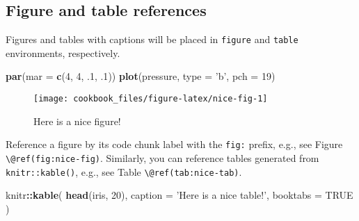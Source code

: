 \documentclass[]{book}
\newenvironment{Shaded}{\begin{snugshade}}{\end{snugshade}}
\newcommand{\DataTypeTok}[1]{\textcolor[rgb]{0.13,0.29,0.53}{#1}}
\newcommand{\DecValTok}[1]{\textcolor[rgb]{0.00,0.00,0.81}{#1}}
\newcommand{\FloatTok}[1]{\textcolor[rgb]{0.00,0.00,0.81}{#1}}
\newcommand{\KeywordTok}[1]{\textcolor[rgb]{0.13,0.29,0.53}{\textbf{#1}}}
\newcommand{\NormalTok}[1]{#1}
\newcommand{\OperatorTok}[1]{\textcolor[rgb]{0.81,0.36,0.00}{\textbf{#1}}}
\newcommand{\OtherTok}[1]{\textcolor[rgb]{0.56,0.35,0.01}{#1}}
\newcommand{\StringTok}[1]{\textcolor[rgb]{0.31,0.60,0.02}{#1}}
\theoremstyle{definition}
\theoremstyle{definition}
\theoremstyle{definition}
\theoremstyle{remark}
\begin{document}
\hypertarget{figure-and-table-references}{%
\subsection{Figure and table
references}\label{figure-and-table-references}}

Figures and tables with captions will be placed in \texttt{figure} and
\texttt{table} environments, respectively.

\begin{Shaded}
\begin{Highlighting}[]
\KeywordTok{par}\NormalTok{(}\DataTypeTok{mar =} \KeywordTok{c}\NormalTok{(}\DecValTok{4}\NormalTok{, }\DecValTok{4}\NormalTok{, }\FloatTok{.1}\NormalTok{, }\FloatTok{.1}\NormalTok{))}
\KeywordTok{plot}\NormalTok{(pressure, }\DataTypeTok{type =} \StringTok{'b'}\NormalTok{, }\DataTypeTok{pch =} \DecValTok{19}\NormalTok{)}
\end{Highlighting}
\end{Shaded}

\begin{figure}

{\centering \texttt{[image: cookbook\_files/figure-latex/nice-fig-1]} 

}

\caption{Here is a nice figure!}\label{fig:nice-fig}
\end{figure}

Reference a figure by its code chunk label with the \texttt{fig:}
prefix, e.g., see Figure \texttt{\textbackslash{}@ref(fig:nice-fig)}.
Similarly, you can reference tables generated from
\texttt{knitr::kable()}, e.g., see Table
\texttt{\textbackslash{}@ref(tab:nice-tab)}.

\begin{Shaded}
\begin{Highlighting}[]
\NormalTok{knitr}\OperatorTok{::}\KeywordTok{kable}\NormalTok{(}
  \KeywordTok{head}\NormalTok{(iris, }\DecValTok{20}\NormalTok{), }\DataTypeTok{caption =} \StringTok{'Here is a nice table!'}\NormalTok{,}
  \DataTypeTok{booktabs =} \OtherTok{TRUE}
\NormalTok{)}
\end{Highlighting}
\end{Shaded}
\end{document}
